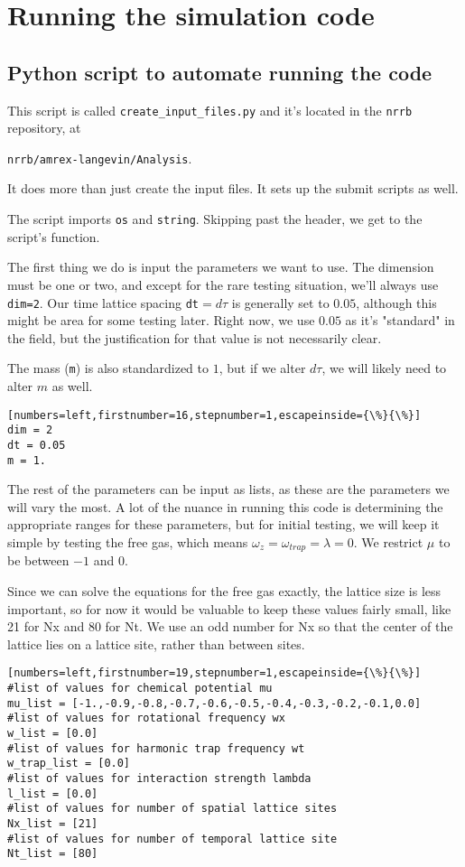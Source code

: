 \documentclass[../RotatingBosons.tex]{subfiles}
\begin{document}
\section{Running the simulation code}
\subsection{Python script to automate running the code}
This script is called \lstinline{create_input_files.py} and it's located in the \lstinline{nrrb} repository, at 

\lstinline{nrrb/amrex-langevin/Analysis}. 

It does more than just create the input files. It sets up the submit scripts as well.

The script imports \lstinline{os} and \lstinline{string}. Skipping past the header, we get to the script's function. 

The first thing we do is input the parameters we want to use. The dimension must be one or two, and except for the rare testing situation, we'll always use \lstinline{dim=2}. Our time lattice spacing \lstinline{dt}$=d\tau$ is generally set to $0.05$, although this might be area for some testing later. Right now, we use $0.05$ as it's "standard" in the field, but the justification for that value is not necessarily clear.

The mass (\lstinline{m}) is also standardized to $1$, but if we alter $d\tau$, we will likely need to alter $m$ as well.

\begin{lstlisting}[numbers=left,firstnumber=16,stepnumber=1,escapeinside={\%}{\%}]
dim = 2 
dt = 0.05 
m = 1.
\end{lstlisting}

The rest of the parameters can be input as lists, as these are the parameters we will vary the most. A lot of the nuance in running this code is determining the appropriate ranges for these parameters, but for initial testing, we will keep it simple by testing the free gas, which means $\omega_{z} = \omega_{trap} = \lambda = 0$. We restrict $\mu$ to be between $-1$ and $0$.

Since we can solve the equations for the free gas exactly, the lattice size is less important, so for now it would be valuable to keep these values fairly small, like 21 for Nx and 80 for Nt. We use an odd number for Nx so that the center of the lattice lies on a lattice site, rather than between sites.

\begin{lstlisting}[numbers=left,firstnumber=19,stepnumber=1,escapeinside={\%}{\%}]
#list of values for chemical potential mu
mu_list = [-1.,-0.9,-0.8,-0.7,-0.6,-0.5,-0.4,-0.3,-0.2,-0.1,0.0]
#list of values for rotational frequency wx
w_list = [0.0] 
#list of values for harmonic trap frequency wt
w_trap_list = [0.0] 
#list of values for interaction strength lambda
l_list = [0.0]
#list of values for number of spatial lattice sites
Nx_list = [21]
#list of values for number of temporal lattice site
Nt_list = [80]
\end{lstlisting}
\end{document}
